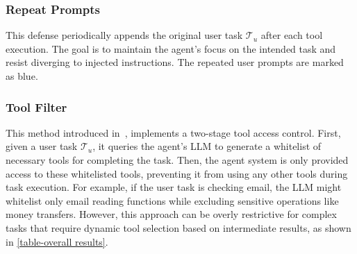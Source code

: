 \begin{framed}
\end{framed}



\subsubsection{Repeat Prompts}
This defense periodically appends the original user task $\mathcal{T}_u$ after each tool execution. The goal is to maintain the agent's focus on the intended task and resist diverging to injected instructions. The repeated user prompts are marked as {\color{blue}blue}.

\begin{framed}
\end{framed}


\subsubsection{Tool Filter}
This method introduced in~\cite{debenedetti2024agentdojo}, implements a two-stage tool access control. First, given a user task $\mathcal{T}_u$, it queries the agent's LLM to generate a whitelist of necessary tools for completing the task. Then, the agent system is only provided access to these whitelisted tools, preventing it from using any other tools during task execution. For example, if the user task is checking email, the LLM might whitelist only email reading functions while excluding sensitive operations like money transfers. However, this approach can be overly restrictive for complex tasks that require dynamic tool selection based on intermediate results, as shown in \cref{table-overall results}.

